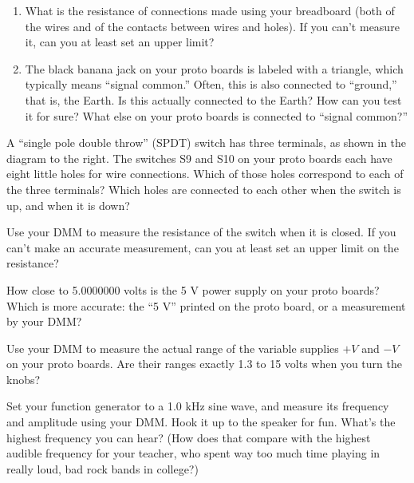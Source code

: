 \begin{enumerate}[wide]
\item What is the resistance of connections made using your breadboard (both of the wires and of the contacts between wires and holes).  If you can't measure it, can you at least set an upper limit?

\item The black banana jack on your proto boards is labeled with a triangle, which typically means ``signal common.'' Often, this is also connected to ``ground,'' that is, the Earth.  Is this actually connected to the Earth?  How can you test it for sure?  What else on your proto boards is connected to ``signal common?''

\end{enumerate}
\begin{enumerate}


\begin{minipage}{.75\textwidth}

\item A ``single pole double throw'' (SPDT) switch has three terminals, as shown in the diagram to the right.  The switches S9 and S10 on your proto boards each have eight little holes for wire connections.  Which of those holes correspond to each of the three terminals?  Which holes are connected to each other when the switch is up, and when it is down?
\end{minipage}
\begin{minipage}{.2\textwidth}
\end{minipage}

\item Use your DMM to measure the resistance of the switch when it is closed.  If you can't make an accurate measurement, can you at least set an upper limit on the resistance? 

\item How close to 5.0000000 volts is the 5 V power supply on your proto boards?  Which is more accurate: the ``5 V'' printed on the proto board, or a measurement by your DMM?

\item Use your DMM to measure the actual range of the variable supplies $+V$ and $-V$ on your proto boards.  Are their ranges exactly 1.3 to 15 volts when you turn the knobs?

\item Set your function generator to a 1.0 kHz sine wave, and measure its frequency and amplitude using your DMM.  Hook it up to the speaker for fun.  What's the highest frequency you can hear?  (How does that compare with the highest audible frequency for your teacher, who spent way too much time playing in really loud, bad rock bands in college?)
 
\end{enumerate}




